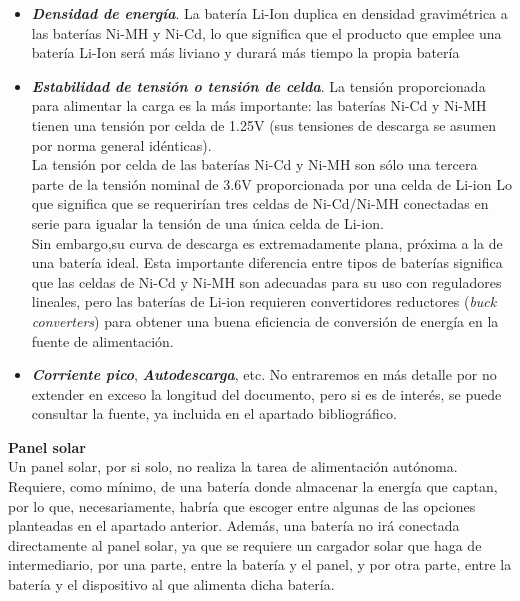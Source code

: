 \documentclass[12pt]{article}
\begin{document}
	\begin{itemize}
		\item \textit{\textbf{Densidad de energía}}. La batería Li-Ion duplica en densidad gravimétrica a las baterías Ni-MH y Ni-Cd, lo que significa que el producto que emplee una batería Li-Ion será más liviano y durará más tiempo la propia batería
		
		\item \textit{\textbf{Estabilidad de tensión o tensión de celda}}. 	La tensión proporcionada para alimentar la carga es la más importante: las baterías Ni-Cd y Ni-MH tienen una tensión por celda de 1.25V (sus tensiones de descarga se asumen por norma general idénticas). \\
		La tensión por celda de las baterías Ni-Cd y Ni-MH son sólo una tercera parte de la tensión nominal de 3.6V proporcionada por una celda de Li-ion Lo que significa que se requerirían tres celdas de Ni-Cd/Ni-MH conectadas en serie para igualar la tensión de una única celda de Li-ion.\\
		Sin embargo,su curva de descarga es extremadamente plana, próxima a la de una batería ideal. Esta importante diferencia entre tipos de baterías significa que las celdas de Ni-Cd y Ni-MH son adecuadas para su uso con reguladores lineales, pero las baterías de Li-ion requieren convertidores reductores (\textit{buck converters}) para obtener una buena eficiencia de conversión de energía en la fuente de alimentación. 
		
		\item \textit{\textbf{Corriente pico}}, \textit{\textbf{Autodescarga}}, etc. No entraremos en más detalle por no extender en exceso la longitud del documento, pero si es de interés, se puede consultar la fuente, ya incluida en el apartado bibliográfico.
	\end{itemize}
	
	
	\noindent \textbf{Panel solar}\\ 
	
	\noindent Un panel solar, por si solo, no realiza la tarea de alimentación autónoma. Requiere, como mínimo, de una batería donde almacenar la energía que captan, por lo que, necesariamente, habría que escoger entre algunas de las opciones planteadas en el apartado anterior. Además, una batería no irá conectada directamente al panel solar, ya que se requiere un cargador solar que haga de intermediario, por una parte, entre la batería y el panel, y por otra parte, entre la batería y el dispositivo al que alimenta dicha batería. \\
	
\end{document}
